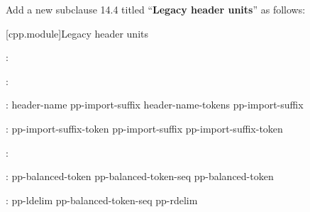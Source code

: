Add a new subclause 14.4 titled ``\textbf{Legacy header units}'' as follows:

\setcounter{section}{3}
[cpp.module]{Legacy header units}%

\begin{std.txt}
\color{addclr}
\begin{bnf}
:\br
  \opt{} \opt{} 
\end{bnf}

\begin{bnf}
:\br
\end{bnf}

\begin{bnf}
:\br
   header-name pp-import-suffix\opt{} \terminal{;}\br
   header-name-tokens pp-import-suffix\opt{} \terminal{;}
\end{bnf}

\begin{bnf}
:\br
  pp-import-suffix-token\br
  pp-import-suffix pp-import-suffix-token
\end{bnf}

\begin{bnf}
:\br
\end{bnf}

\begin{bnf}
:\br
  pp-balanced-token\br
  pp-balanced-token-seq pp-balanced-token
\end{bnf}

\begin{bnf}
:\br
  pp-ldelim pp-balanced-token-seq\opt{} pp-rdelim\br
\end{bnf}

\begin{bnf}
 \br
  \terminal{(    [    \{    <:    <\%}
\end{bnf}

\begin{bnf}
 \br
  \terminal{)    ]    \}    :>    \%>}
\end{bnf}


\end{std.txt}
